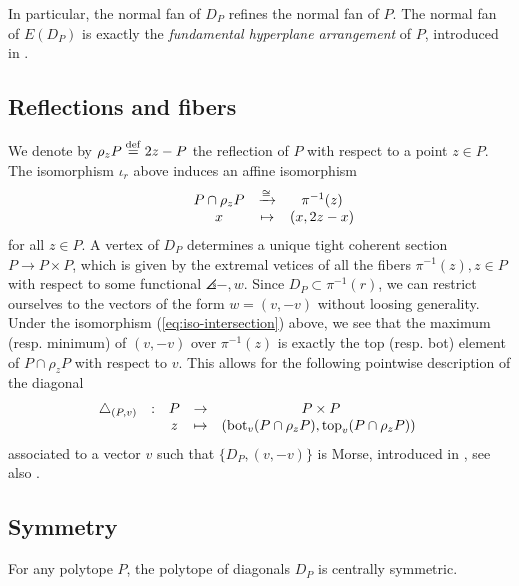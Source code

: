 In particular, the normal fan of $D_P$ refines the normal fan of $P$. 
The normal fan of $E(D_P)$ is exactly the \emph{fundamental hyperplane arrangement} of $P$, introduced in \cite[Definition 1.18]{GLA21}.


\subsection{Reflections and fibers}

We denote by $\rho_z P \stackrel{\mathrm{def}}{=} 2z-P$ the reflection of $P$ with respect to a point $z \in P$.
The isomorphism $\iota_r$ above induces an affine isomorphism
\begin{equation}
\label{eq:iso-intersection}
	\begin{matrix}
		& & P \cap \rho_z P & \xrightarrow{\cong} & \pi^{-1}(z) \\
		& & x & \mapsto & (x,2z-x)
	\end{matrix}
\end{equation}
for all $z \in P$.
A vertex of $D_P$ determines a unique tight coherent section $P \to P \times P$, which is given by the extremal vetices of all the fibers $\pi^{-1}(z), z \in P$ with respect to some functional $\angles{-,w}$.
Since $D_P \subset \pi^{-1}(r)$, we can restrict ourselves to the vectors of the form $w=(v,-v)$ without loosing generality.
Under the isomorphism (\ref{eq:iso-intersection}) above, we see that the maximum (resp. minimum) of $(v,-v)$ over $\pi^{-1}(z)$ is exactly the top (resp. bot) element of $P\cap \rho_z P$ with respect to $v$.
This allows for the following pointwise description of the diagonal
\begin{equation*}
	\begin{matrix}
		\triangle_{(P,v)} & : & P & \to & P \times P \\
		& & z & \mapsto & (\bm_v(P \cap \rho_z P),\tp_v(P \cap \rho_z P)) \ 
	\end{matrix}
\end{equation*}
associated to a vector $v$ such that $\{D_P, (v,-v)\}$ is Morse, introduced in \cite[Definition 10]{MTTV19}, see also \cite[Proposition 1.15]{GLA21}.


\subsection{Symmetry}

\begin{lemma}
	For any polytope $P$, the polytope of diagonals $D_P$ is centrally symmetric.
\end{lemma}

